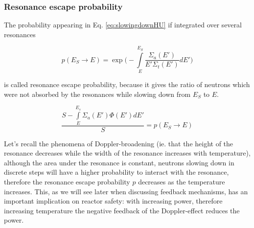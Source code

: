 \subsubsection{Resonance escape probability}

The probability appearing in Eq. \eqref{eq:slowingdownHU} if integrated over several resonances 

$$p(E_S\rightarrow E)=\exp\Bigg(-\int\limits_E^{E_S}\frac{\Sigma_a(E')}{E'\Sigma_t(E')}dE'\Bigg)$$

is called resonance escape probability, because it gives the ratio of neutrons which were not absorbed by the resonances while slowing down from $E_S$ to $E$.

$$\frac{S-\int\limits_E^{E_s}\Sigma_a(E')\Phi(E')dE'}{S}=p(E_S\rightarrow E)$$

Let's recall the phenomena of Doppler-broadening (ie. that the height of the resonance decreases while the width of the resonance increases with temperature), although the area under the resonance is constant, neutrons slowing down in discrete steps will have a higher probability to interact with the resonance, therefore the resonance escape probability $p$ decreases as the temperature increases. This, as we will see later when discussing feedback mechanisms, has an important implication on reactor safety: with increasing power, therefore increasing temperature the negative feedback of the Doppler-effect reduces the power.

%
%
%
%
%
%
%
%
%
%

